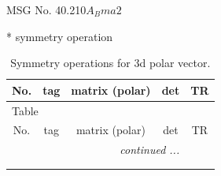 \documentclass[fleqn,8pt]{jsarticle}
\begin{document}
\setcounter{MaxMatrixCols}{32}

\renewcommand{\tablename}{Table~}
\renewcommand{\figurename}{Figure~}
\begin{center}
\LARGE
MSG No. 40.210\quad$A_{B}ma2$
\end{center}
* symmetry operation
\renewcommand{\arraystretch}{1.3}
\begin{longtable}{ccccc}
\caption{Symmetry operations for 3d polar vector.}
 \\
 \hline \hline
No. & tag & matrix (polar) & det & TR \\ \hline \endfirsthead

\multicolumn{4}{l}{\tablename\ \thetable{}} \\
 \hline \hline
No. & tag & matrix (polar) & det & TR \\ \hline \endhead

 \hline \hline
\multicolumn{4}{r}{\footnotesize\it continued ...} \\ \endfoot

 \hline \hline
\multicolumn{4}{r}{} \\ \endlastfoot


\end{longtable}
\end{document}
